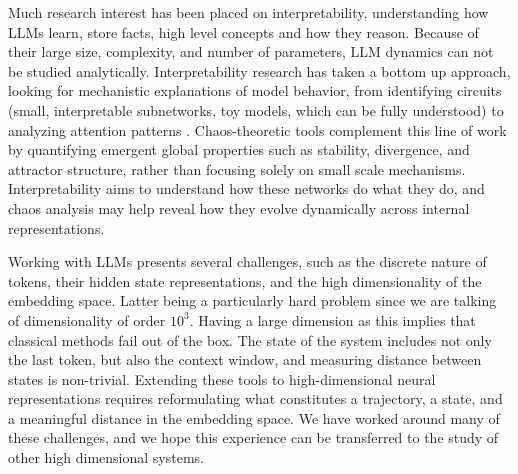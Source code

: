 \documentclass[a4paper,12pt]{article}
\begin{document}


Much research interest has been placed on interpretability, understanding how LLMs learn, store facts, high level concepts and how they reason. Because of their large size, complexity, and number of parameters, LLM dynamics can not be studied analytically.
Interpretability research has taken a bottom up approach, looking for mechanistic explanations of model behavior, from identifying circuits (small, interpretable subnetworks, toy models, which can be fully understood) to analyzing attention patterns \cite{olah2020zoom, ameisen2025circuit, lindsey2025biology}. Chaos-theoretic tools complement this line of work by quantifying emergent global properties such as stability, divergence, and attractor structure, rather than focusing solely on small scale mechanisms. Interpretability aims to understand how these networks do what they do, and chaos analysis may help reveal how they evolve dynamically across internal representations.

Working with LLMs presents several challenges, such as the discrete nature of tokens, their hidden state representations, and the high dimensionality of the embedding space. Latter being a particularly hard problem since we are talking of dimensionality of order $10^3$. Having a large dimension as this implies that classical methods fail out of the box.
The state of the system includes not only the last token, but also the context window, and measuring distance between states is non-trivial.
Extending these tools to high-dimensional neural representations requires reformulating what constitutes a trajectory, a state, and a meaningful distance in the embedding space. 
We have worked around many of these challenges, and we hope this experience can be transferred to the study of other high dimensional systems.
\end{document}
